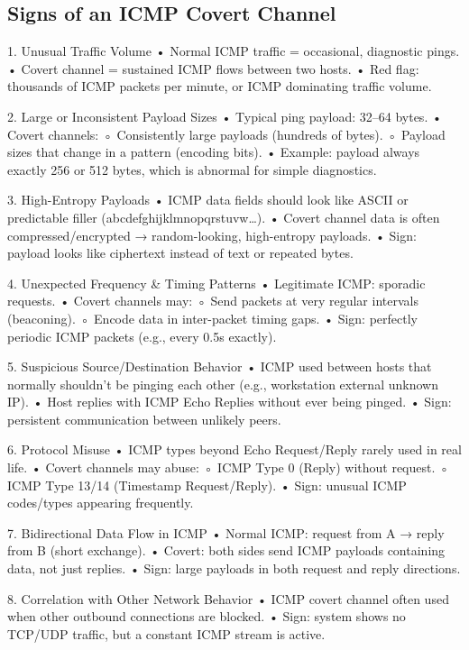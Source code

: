 \subsection{Signs of an ICMP Covert Channel} 
1. Unusual Traffic Volume
    • Normal ICMP traffic = occasional, diagnostic pings.
    • Covert channel = sustained ICMP flows between two hosts.
    • Red flag: thousands of ICMP packets per minute, or ICMP dominating traffic volume.

2. Large or Inconsistent Payload Sizes
    • Typical ping payload: 32–64 bytes.
    • Covert channels:
        ◦ Consistently large payloads (hundreds of bytes).
        ◦ Payload sizes that change in a pattern (encoding bits).
    • Example: payload always exactly 256 or 512 bytes, which is abnormal for simple diagnostics. 

3. High-Entropy Payloads
    • ICMP data fields should look like ASCII or predictable filler (abcdefghijklmnopqrstuvw…).
    • Covert channel data is often compressed/encrypted → random-looking, high-entropy payloads.
    • Sign: payload looks like ciphertext instead of text or repeated bytes.

4. Unexpected Frequency \& Timing Patterns
    • Legitimate ICMP: sporadic requests.
    • Covert channels may:
        ◦ Send packets at very regular intervals (beaconing).
        ◦ Encode data in inter-packet timing gaps.
    • Sign: perfectly periodic ICMP packets (e.g., every 0.5s exactly).

5. Suspicious Source/Destination Behavior
    • ICMP used between hosts that normally shouldn’t be pinging each other (e.g., workstation  external unknown IP).
    • Host replies with ICMP Echo Replies without ever being pinged.
    • Sign: persistent communication between unlikely peers.

6. Protocol Misuse
    • ICMP types beyond Echo Request/Reply rarely used in real life.
    • Covert channels may abuse:
        ◦ ICMP Type 0 (Reply) without request.
        ◦ ICMP Type 13/14 (Timestamp Request/Reply).
    • Sign: unusual ICMP codes/types appearing frequently.

7. Bidirectional Data Flow in ICMP
    • Normal ICMP: request from A → reply from B (short exchange).
    • Covert: both sides send ICMP payloads containing data, not just replies.
    • Sign: large payloads in both request and reply directions. 

8. Correlation with Other Network Behavior
    • ICMP covert channel often used when other outbound connections are blocked.
    • Sign: system shows no TCP/UDP traffic, but a constant ICMP stream is active.


